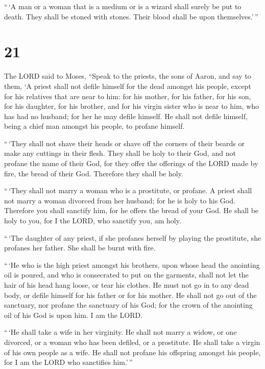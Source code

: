  ``\,`A man or a woman that is a medium or is a wizard
shall surely be put to death. They shall be stoned with stones. Their
blood shall be upon themselves.'\,''

\hypertarget{section-20}{%
\section{21}\label{section-20}}

 The LORD said to Moses, ``Speak to the priests, the sons of
Aaron, and say to them, `A priest shall not defile himself for the dead
amongst his people,  except for his relatives that are near
to him: for his mother, for his father, for his son, for his daughter,
for his brother,  and for his virgin sister who is near to
him, who has had no husband; for her he may defile himself. 
He shall not defile himself, being a chief man amongst his people, to
profane himself.

 ``\,`They shall not shave their heads or shave off the
corners of their beards or make any cuttings in their flesh.
 They shall be holy to their God, and not profane the name
of their God, for they offer the offerings of the LORD made by fire, the
bread of their God. Therefore they shall be holy.

 ``\,`They shall not marry a woman who is a prostitute, or
profane. A priest shall not marry a woman divorced from her husband; for
he is holy to his God.  Therefore you shall sanctify him,
for he offers the bread of your God. He shall be holy to you, for I the
LORD, who sanctify you, am holy.

 ``\,`The daughter of any priest, if she profanes herself by
playing the prostitute, she profanes her father. She shall be burnt with
fire.

 ``\,`He who is the high priest amongst his brothers, upon
whose head the anointing oil is poured, and who is consecrated to put on
the garments, shall not let the hair of his head hang loose, or tear his
clothes.  He must not go in to any dead body, or defile
himself for his father or for his mother.  He shall not go
out of the sanctuary, nor profane the sanctuary of his God; for the
crown of the anointing oil of his God is upon him. I am the LORD.

 ``\,`He shall take a wife in her virginity. 
He shall not marry a widow, or one divorced, or a woman who has been
defiled, or a prostitute. He shall take a virgin of his own people as a
wife.  He shall not profane his offspring amongst his
people, for I am the LORD who sanctifies him.'\,''

